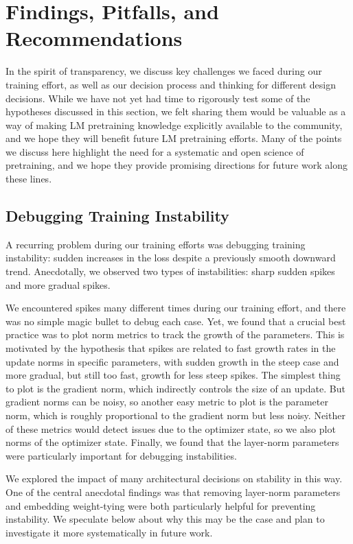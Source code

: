 \section{Findings, Pitfalls, and Recommendations}

In the spirit of transparency, we discuss key challenges we faced during our training effort, as well as our decision process and thinking for different design decisions. While we have not yet had time to rigorously test some of the hypotheses discussed in this section, we felt sharing them would be valuable as a way of making LM pretraining knowledge explicitly available to the community, and we hope they will benefit future LM pretraining efforts.
Many of the points we discuss here highlight the need for a systematic and open science of pretraining, and we hope they provide promising directions for future work along these lines.

\subsection{Debugging Training Instability}

A recurring problem during our training efforts was debugging training instability: sudden increases in the loss despite a previously smooth downward trend.
Anecdotally, we observed two types of instabilities: sharp sudden spikes and more gradual spikes.

We encountered spikes many different times during our training effort, and there was no simple magic bullet to debug each case.
Yet, we found that a crucial best practice was to plot norm metrics to track the growth of the parameters.
This is motivated by the hypothesis that spikes are related to fast growth rates in the update norms in specific parameters, with sudden growth in the steep case and more gradual, but still too fast, growth for less steep spikes.
The simplest thing to plot is the gradient norm, which indirectly controls the size of an update.
But gradient norms can be noisy, so another easy metric to plot is the parameter norm, which is roughly proportional to the gradient norm \citep{merrill2021effects} but less noisy.
Neither of these metrics would detect issues due to the optimizer state, so we also plot norms of the optimizer state.
Finally, we found that the layer-norm parameters were particularly important for debugging instabilities.

We explored the impact of many architectural decisions on stability in this way.
One of the central anecdotal findings was that removing layer-norm parameters and embedding weight-tying were both particularly helpful for preventing instability.
We speculate below about why this may be the case and plan to investigate it more systematically in future work.

